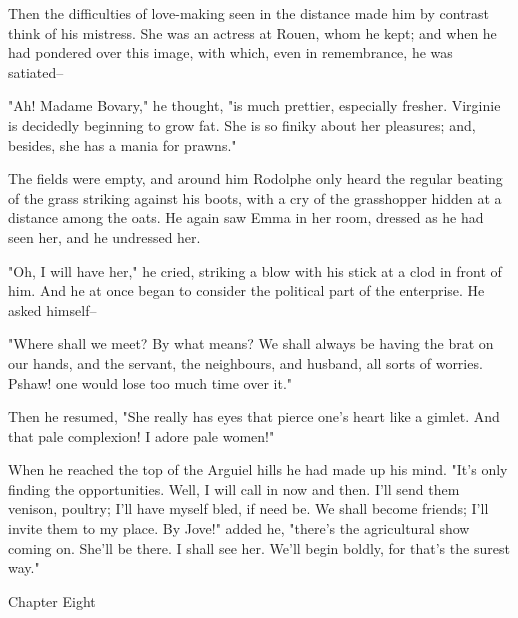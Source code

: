 \documentclass{tufte-book}
\begin{document}
Then the difficulties of love-making seen in the distance made him by
contrast think of his mistress. She was an actress at Rouen, whom he
kept; and when he had pondered over this image, with which, even in
remembrance, he was satiated--

"Ah! Madame Bovary," he thought, "is much prettier, especially fresher.
Virginie is decidedly beginning to grow fat. She is so finiky about her
pleasures; and, besides, she has a mania for prawns."

The fields were empty, and around him Rodolphe only heard the regular
beating of the grass striking against his boots, with a cry of the
grasshopper hidden at a distance among the oats. He again saw Emma in
her room, dressed as he had seen her, and he undressed her.

"Oh, I will have her," he cried, striking a blow with his stick at a
clod in front of him. And he at once began to consider the political
part of the enterprise. He asked himself--

"Where shall we meet? By what means? We shall always be having the brat
on our hands, and the servant, the neighbours, and husband, all sorts of
worries. Pshaw! one would lose too much time over it."

Then he resumed, "She really has eyes that pierce one's heart like a
gimlet. And that pale complexion! I adore pale women!"

When he reached the top of the Arguiel hills he had made up his mind.
"It's only finding the opportunities. Well, I will call in now and then.
I'll send them venison, poultry; I'll have myself bled, if need be. We
shall become friends; I'll invite them to my place. By Jove!" added he,
"there's the agricultural show coming on. She'll be there. I shall see
her. We'll begin boldly, for that's the surest way."



Chapter Eight
\end{document}
